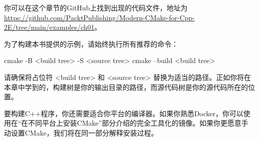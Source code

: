 你可以在这个章节的GitHub上找到出现的代码文件，地址为 \url{https://github.com/PacktPublishing/Modern-CMake-for-Cpp-2E/tree/main/examples/ch01}。

为了构建本书提供的示例，请始终执行所有推荐的命令：

\begin{shell}
cmake -B <build tree> -S <source tree>
cmake --build <build tree>
\end{shell}

请确保将占位符 <build tree> 和 <source tree> 替换为适当的路径。正如你将在本章中学到的，构建树是你的输出目录的路径，而源代码树是你的源代码所在的位置。

要构建C++程序，你还需要适合你平台的编译器。如果你熟悉Docker，你可以使用在“在不同平台上安装CMake”部分介绍的完全工具化的镜像。如果你更愿意手动设置CMake，我们将在同一部分解释安装过程。










